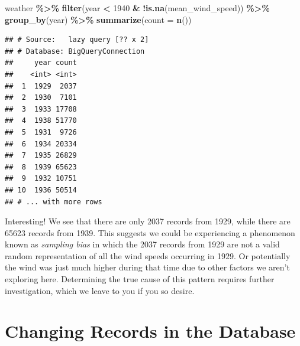 \documentclass[
]{krantz}
\newenvironment{Shaded}{\begin{snugshade}}{\end{snugshade}}
\newcommand{\DataTypeTok}[1]{\textcolor[rgb]{0.13,0.29,0.53}{#1}}
\newcommand{\DecValTok}[1]{\textcolor[rgb]{0.00,0.00,0.81}{#1}}
\newcommand{\KeywordTok}[1]{\textcolor[rgb]{0.13,0.29,0.53}{\textbf{#1}}}
\newcommand{\NormalTok}[1]{#1}
\newcommand{\OperatorTok}[1]{\textcolor[rgb]{0.81,0.36,0.00}{\textbf{#1}}}
\newcommand{\StringTok}[1]{\textcolor[rgb]{0.31,0.60,0.02}{#1}}
\begin{document}
\begin{Shaded}
\begin{Highlighting}[]
\NormalTok{weather }\OperatorTok{\%\textgreater{}\%}
\StringTok{  }\KeywordTok{filter}\NormalTok{(year }\OperatorTok{\textless{}}\StringTok{ }\DecValTok{1940} \OperatorTok{\&}\StringTok{ }\OperatorTok{!}\KeywordTok{is.na}\NormalTok{(mean\_wind\_speed)) }\OperatorTok{\%\textgreater{}\%}
\StringTok{  }\KeywordTok{group\_by}\NormalTok{(year) }\OperatorTok{\%\textgreater{}\%}
\StringTok{  }\KeywordTok{summarize}\NormalTok{(}\DataTypeTok{count =} \KeywordTok{n}\NormalTok{())}
\end{Highlighting}
\end{Shaded}

\begin{verbatim}
## # Source:   lazy query [?? x 2]
## # Database: BigQueryConnection
##     year count
##    <int> <int>
##  1  1929  2037
##  2  1930  7101
##  3  1933 17708
##  4  1938 51770
##  5  1931  9726
##  6  1934 20334
##  7  1935 26829
##  8  1939 65623
##  9  1932 10751
## 10  1936 50514
## # ... with more rows
\end{verbatim}

Interesting! We see that there are only 2037 records from 1929, while there are 65623 records from 1939. This suggests we could be experiencing a phenomenon known as \emph{sampling bias} in which the 2037 records from 1929 are not a valid random representation of all the wind speeds occurring in 1929. Or potentially the wind was just much higher during that time due to other factors we aren't exploring here. Determining the true cause of this pattern requires further investigation, which we leave to you if you so desire.

\hypertarget{changing-records-in-the-database}{%
\section{Changing Records in the Database}\label{changing-records-in-the-database}}
\end{document}
